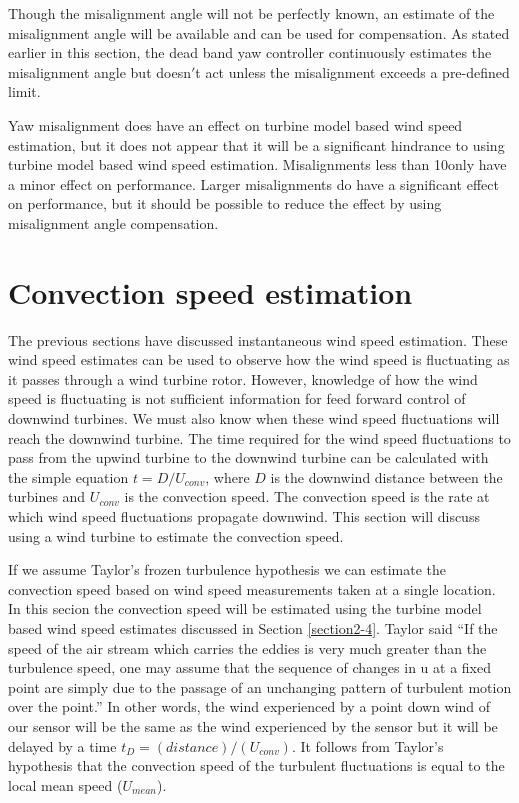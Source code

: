 Though the misalignment angle will not be perfectly known, an estimate of the misalignment angle will be available and can be used for compensation. As stated earlier in this section, the dead band yaw controller continuously estimates the misalignment angle but doesn$'$t act unless the misalignment exceeds a pre-defined limit. 

Yaw misalignment does have an effect on turbine model based wind speed estimation, but it does not appear that it will be a significant hindrance to using turbine model based wind speed estimation. Misalignments less than 10\degree only have a minor effect on performance. Larger misalignments do have a significant effect on performance, but it should be possible to reduce the effect by using misalignment angle compensation.






\section{Convection speed estimation} \label{section2-5}

The previous sections have discussed instantaneous wind speed estimation. These wind speed estimates can be used to observe how the wind speed is fluctuating as it passes through a wind turbine rotor. However, knowledge of how the wind speed is fluctuating is not sufficient information for feed forward control of downwind turbines. We must also know when these wind speed fluctuations will reach the downwind turbine. The time required for the wind speed fluctuations to pass from the upwind turbine to the downwind turbine can be calculated with the simple equation $t = D/U_{conv}$, where $D$ is the downwind distance between the turbines and $U_{conv}$ is the convection speed. The convection speed is the rate at which wind speed fluctuations propagate downwind. This section will discuss using a wind turbine to estimate the convection speed.

If we assume Taylor's frozen turbulence hypothesis we can estimate the convection speed based on wind speed measurements taken at a single location. In this secion the convection speed will be estimated using the turbine model based wind speed estimates discussed in Section \ref{section2-4}. Taylor said ``If the speed of the air stream which carries the eddies is very much greater than the turbulence speed, one may assume that the sequence of changes in u at a fixed point are simply due to the passage of an unchanging pattern of turbulent motion over the point.'' \cite{taylor1938} In other words, the wind experienced by a point down wind of our sensor will be the same as the wind experienced by the sensor but it will be delayed by a time $t_D = (distance)/(U_{conv})$. It follows from Taylor's hypothesis that the convection speed of the turbulent fluctuations is equal to the local mean speed ($U_{mean}$). 

